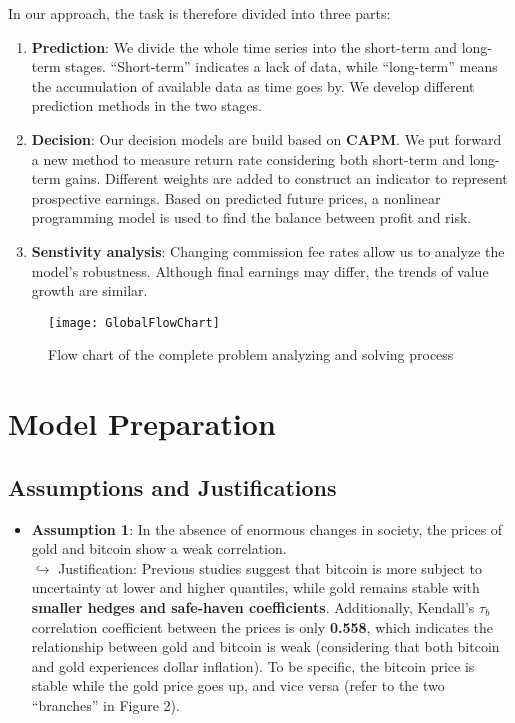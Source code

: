 \documentclass{mcmthesis}
\begin{document}
{	In our approach, the task is therefore divided into three parts: 
	\begin{enumerate}
		\item \textbf{Prediction}: We divide the whole time series into the short-term and long-term stages. ``Short-term'' indicates a lack of data, while ``long-term'' means the accumulation of available data as time goes by. We develop different prediction methods in the two stages.
		\item \textbf{Decision}: Our decision models are build based on \textbf{CAPM}. We put forward a new method to measure return rate considering both short-term and long-term gains. Different weights are added to construct an indicator to represent prospective earnings. Based on predicted future prices, a nonlinear programming model is used to find the balance between profit and risk.
		\item \textbf{Senstivity analysis}: Changing commission fee rates allow us to analyze the model's robustness. Although final earnings may differ, the trends of value growth are similar. 
	\end{enumerate}

	\begin{figure}[h]
		\centering \texttt{[image: GlobalFlowChart]}
		\caption{Flow chart of the complete problem analyzing and solving process}
	\end{figure}
	
	\section{Model Preparation}
	
	\subsection{Assumptions and Justifications}
	\begin{itemize}
		\item \textbf{Assumption 1}: 
		In the absence of enormous changes in society, the prices of gold and bitcoin show a weak correlation. 
		\\ $\hookrightarrow$ Justification: 
		Previous studies suggest that bitcoin is more subject to uncertainty at lower and higher quantiles, while gold remains stable with \textbf{smaller hedges and safe-haven coefficients}. Additionally, Kendall's $\tau_b$ correlation coefficient between the prices is only \textbf{0.558}, which indicates the relationship between gold and bitcoin is weak (considering that both bitcoin and gold experiences dollar inflation). To be specific, the bitcoin price is stable while the gold price goes up, and vice versa (refer to the two ``branches'' in Figure 2). 
		

\end{itemize}}
\end{document}
